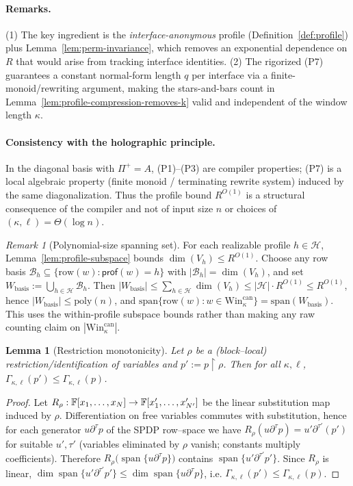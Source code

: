 \documentclass[12pt]{article}
\DeclareMathOperator{\Span}{span}
\newtheorem{lemma}[theorem]{Lemma}
\theoremstyle{definition}
\theoremstyle{definition}
\theoremstyle{remark}
\newtheorem{remark}{Remark}
\theoremstyle{remark}
\begin{document}
\paragraph{Remarks.}
(1) The key ingredient is the \emph{interface-anonymous} profile
(Definition~\ref{def:profile}) plus Lemma~\ref{lem:perm-invariance}, which removes an exponential dependence
on $R$ that would arise from tracking interface identities. (2) The rigorized (P7) guarantees a constant
normal-form length $q$ per interface via a finite-monoid/rewriting argument, making the stars-and-bars
count in Lemma~\ref{lem:profile-compression-removes-k} valid and independent of the window length $\kappa$.

\paragraph{Consistency with the holographic principle.}
In the diagonal basis with $\Pi^+=A$, (P1)--(P3) are compiler properties; (P7) is a local algebraic
property (finite monoid / terminating rewrite system) induced by the same diagonalization. Thus the
profile bound $R^{O(1)}$ is a structural consequence of the compiler and not of input size $n$ or choices
of $(\kappa,\ell)=\Theta(\log n)$.

\begin{remark}[Polynomial-size spanning set]
\label{rem:poly-spanning-set}
For each realizable profile $h\in\mathcal{H}$, Lemma~\ref{lem:profile-subspace} bounds $\dim(V_h)\le R^{O(1)}$.
Choose any row basis $\mathcal{B}_h\subseteq \{\mathrm{row}(w): \mathsf{prof}(w)=h\}$
with $|\mathcal{B}_h|=\dim(V_h)$, and set
$W_{\mathrm{basis}} := \bigcup_{h\in \mathcal{H}}\mathcal{B}_h$.
Then $|W_{\mathrm{basis}}|\le \sum_{h\in \mathcal{H}}\dim(V_h)\le |\mathcal{H}|\cdot R^{O(1)} \le R^{O(1)}$, hence $|W_{\mathrm{basis}}|\le \mathrm{poly}(n)$,
and $\mathrm{span}\{\mathrm{row}(w): w\in \mathrm{Win}^{\mathrm{can}}_\kappa\}=\mathrm{span}(W_{\mathrm{basis}})$.
This uses the within-profile subspace bounds rather than making any raw counting claim on $|\mathrm{Win}^{\mathrm{can}}_\kappa|$.
\end{remark}

\begin{lemma}[Restriction monotonicity]
\label{lem:restriction}
Let $\rho$ be a (block--local) restriction/identification of variables and $p':=p\!\upharpoonright\!\rho$.
Then for all $\kappa,\ell$, $\Gamma_{\kappa,\ell}(p')\le \Gamma_{\kappa,\ell}(p)$.
\end{lemma}
\begin{proof}
Let $R_\rho:\Bbb F[x_1,\dots,x_N]\to \Bbb F[x'_1,\dots,x'_{N'}]$ be the linear substitution map induced by $\rho$.
Differentiation on free variables commutes with substitution, hence for each generator $u\partial^\tau p$ of the SPDP row--space we have
$R_\rho(u\partial^\tau p)=u'\partial^{\tau'}(p')$ for suitable $u',\tau'$ (variables eliminated by $\rho$ vanish; constants multiply coefficients).
Therefore $R_\rho\big(\Span\{u\partial^\tau p\}\big)$ contains $\Span\{u'\partial^{\tau'}p'\}$.
Since $R_\rho$ is linear, $\dim\Span\{u'\partial^{\tau'}p'\}\le \dim\Span\{u\partial^\tau p\}$, i.e. $\Gamma_{\kappa,\ell}(p')\le \Gamma_{\kappa,\ell}(p)$.
\end{proof}
\end{document}
